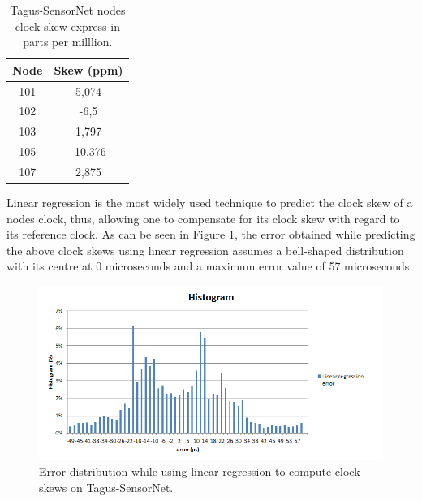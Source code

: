 \begin{table}[!htb]
\begin{center}
\begin{tabular}{|c|c|}
\hline
Node & Skew (ppm)\\ \hline
101 & 5,074 \\ \hline
102 &  -6,5 \\ \hline
103 &  1,797 \\ \hline
105 &  -10,376 \\ \hline
107 &  2,875 \\ \hline
\end{tabular}
\caption{Tagus-SensorNet nodes clock skew express in parts per milllion.}
\label{tsnclockskewtable}
\end{center}
\end{table}

Linear regression is the most widely used technique to predict the clock skew of a nodes clock, thus, allowing one to compensate for its clock skew with regard to its reference clock. As can be seen in Figure \ref{tsnclockskewerror}, the error obtained while predicting the above clock skews using linear regression assumes a bell-shaped distribution with its centre at 0 microseconds and a maximum error value of 57 microseconds.\\

\begin{figure}[!htb]
\begin{center}
\includegraphics[scale=0.5]{./images/08-ttsp-tsn_histogram.png}
\end{center}
\caption{Error distribution while using linear regression to compute clock skews on Tagus-SensorNet.}
\label{tsnclockskewerror}
\end{figure}

